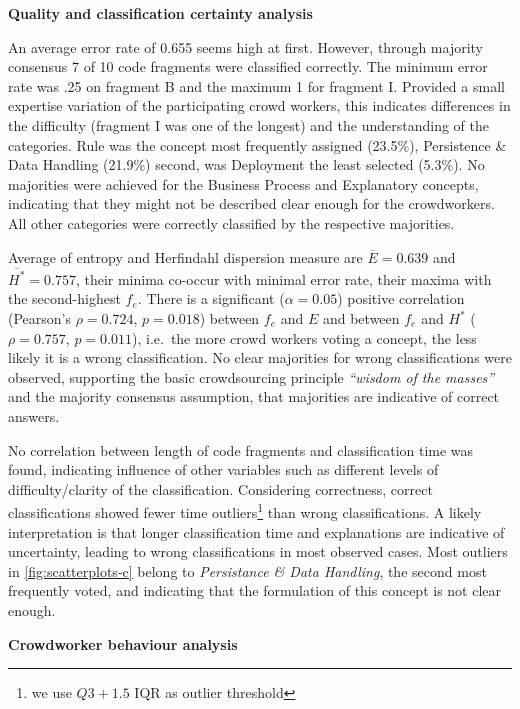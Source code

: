 \textbf{Quality and classification certainty analysis}

An average error rate of 0.655 seems high at first.
However, through majority consensus 7 of 10 code fragments were classified correctly.
The minimum error rate was .25 on fragment B and the maximum 1 for fragment I.
Provided a small expertise variation of the participating crowd workers, this indicates differences in the difficulty (fragment I was one of the longest) and the understanding of the categories.
Rule was the concept most frequently assigned (23.5\%), Persistence \& Data Handling (21.9\%) second, was Deployment the least selected (5.3\%).
No majorities were achieved for the Business Process and Explanatory concepts, indicating that they might not be described clear enough for the crowdworkers.
All other categories were correctly classified by the respective majorities.

Average of entropy and Herfindahl dispersion measure are \(\overline E = 0.639\) and \(\overline{H^*} = 0.757\), their minima co-occur with minimal error rate, their maxima with the second-highest \(f_e\).
There is a significant (\(\alpha=0.05\)) positive correlation (Pearson's \(\rho=0.724\), \(p=0.018\)) between \(f_e\) and \(E\) and between \(f_e\) and \(H^*\) (\(\rho=0.757\), \(p=0.011\)), i.e.~the more crowd workers voting a concept, the less likely it is a wrong classification.
No clear majorities for wrong classifications were observed, supporting the basic crowdsourcing principle \emph{``wisdom of the masses''} and the majority consensus assumption, that majorities are indicative of correct answers.

No correlation between length of code fragments and classification time was found, indicating influence of other variables such as different levels of difficulty/clarity of the classification.
Considering correctness, correct classifications showed fewer time outliers\footnote{we use \(Q3 + 1.5 \text{ IQR}\) as outlier threshold} than wrong classifications.
A likely interpretation is that longer classification time and explanations are indicative of uncertainty, leading to wrong classifications in most observed cases.
Most outliers in \cref{fig:scatterplots-c} belong to \emph{Persistance \& Data Handling}, the second most frequently voted, and indicating that the formulation of this concept is not clear enough.

\textbf{Crowdworker behaviour analysis}


